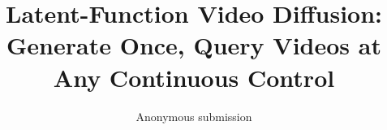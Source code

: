 \documentclass[10pt,twocolumn,letterpaper]{article}
\title{Latent-Function Video Diffusion: Generate Once, Query Videos at Any Continuous Control}
\author{Anonymous submission}
\begin{document}
\maketitlesupplementary
\renewcommand{\thesection}{\Alph{section}}
\renewcommand{\thetable}{S\arabic{table}}
\renewcommand{\thefigure}{S\arabic{figure}}

\FloatBarrier
\end{document}
